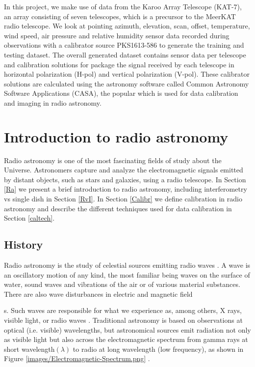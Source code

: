 In this project, we make use of data from the Karoo Array Telescope (KAT-7), an array consisting of seven telescopes, which is a precursor to the MeerKAT radio telescope. We look at pointing azimuth, elevation, scan, offset, temperature, wind speed, air pressure and relative humidity sensor data recorded during observations with a calibrator source PKS1613-586 to generate the training and testing dataset. The overall generated dataset contains sensor data per telescope and calibration solutions for package the signal received by each telescope in horizontal polarization (H-pol)  and vertical polarization (V-pol). These calibrator solutions are calculated using the astronomy software called Common Astronomy Software Applications (CASA), the popular which is used for data calibration and imaging in radio astronomy.
 
\section{Introduction to radio astronomy}

Radio astronomy is one of the most fascinating fields of study about the Universe. Astronomers capture and analyze the electromagnetic signals emitted by distant objects, such as stars and galaxies, using a radio telescope. In Section \ref{Ra} we present a brief introduction to radio astronomy, including interferometry vs single dish in Section \ref{RvI}. In Section \ref{Calibr} we define calibration in radio astronomy and describe the different techniques used for data calibration in Section \ref{caltech}.
\label{Ra}
\subsection{History}


Radio astronomy is the study of celestial sources emitting radio waves \citep{verschuur2015invisible}. A wave is an oscillatory motion of any kind, the most familiar being waves on the surface of water, sound waves and vibrations of the air or of various material substances. There are also wave disturbances in electric and magnetic field\newtheorem{mydef}{Definition}s. Such waves are responsible for what we experience as, among others, X rays, visible light, or radio waves \citep{cassidy2002wave}. Traditional astronomy is based on observations at optical (i.e. visible) wavelengths, but astronomical sources emit radiation not only as visible light but
also across the electromagnetic spectrum from gamma rays at short wavelength$(\lambda)$ to radio at long wavelength (low frequency), as shown in Figure \ref{images/Electromagnetic-Spectrum.png} \citep{staats2016genetic}.

